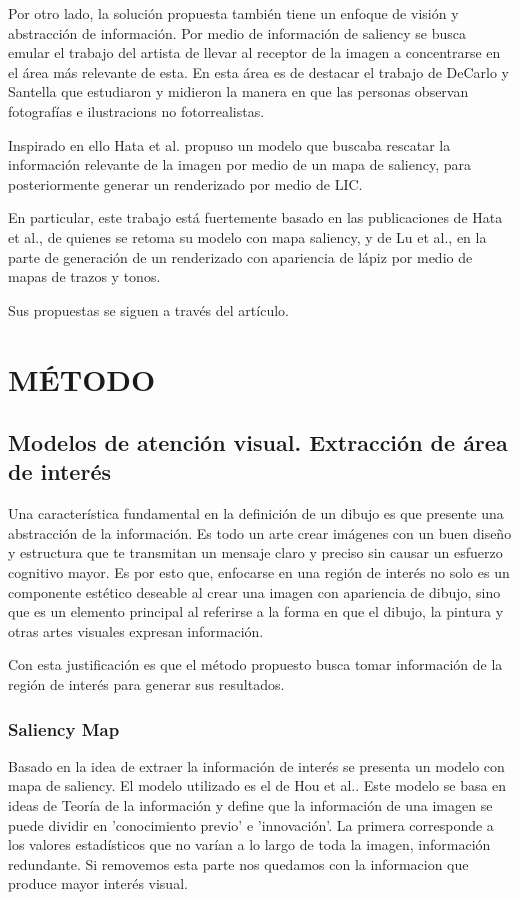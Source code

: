 \documentclass[letterpaper, 10 pt, conference]{ieeeconf}  %
\begin{document}
Por otro lado, la solución propuesta también tiene un enfoque de visión y abstracción de información. Por medio de información de saliency se busca emular el trabajo del artista de llevar al receptor de la imagen a concentrarse en el área más relevante de esta. En esta área es de destacar el trabajo de DeCarlo y Santella\cite{dec} que estudiaron y midieron la manera en que las personas observan fotografías e ilustracions no fotorrealistas. 

Inspirado en ello Hata et al.\cite{hata} propuso un modelo que buscaba rescatar la información relevante de la imagen por medio de un mapa de saliency, para posteriormente generar un renderizado por medio de LIC.

En particular, este trabajo está fuertemente basado en las publicaciones de Hata et al.\cite{hata}, de quienes se retoma su modelo con mapa saliency, y de Lu et al.\cite{lu}, en la parte de generación de un renderizado con apariencia de lápiz por medio de mapas de trazos y tonos.

Sus propuestas se siguen a través del artículo.

\section{MÉTODO}


\subsection{Modelos de atención visual. Extracción de área de interés}
Una característica fundamental en la definición de un dibujo es que presente una abstracción de la información. Es todo un arte crear imágenes con un buen diseño y estructura que te transmitan un mensaje claro y preciso sin causar un esfuerzo cognitivo mayor.
Es por esto que, enfocarse  en una región de interés no solo es un componente estético deseable al crear una imagen con apariencia de dibujo, sino que es un elemento principal al referirse a la forma en que el dibujo, la pintura y otras artes visuales expresan información. 

Con esta justificación es que el método propuesto busca tomar información de la región de interés para  generar sus resultados.

\subsubsection{Saliency Map}
Basado en la idea de extraer la información de interés se presenta un modelo con mapa de saliency.
El modelo utilizado es el de Hou et al.\cite{hou}. Este modelo se basa en ideas de Teoría de la información y  define que la información de una imagen se puede dividir en 'conocimiento previo' e 'innovación'. La primera corresponde a los valores estadísticos que no varían a lo largo de toda la imagen, información redundante. Si removemos esta parte nos quedamos con la informacion que produce mayor interés visual.
\end{document}
